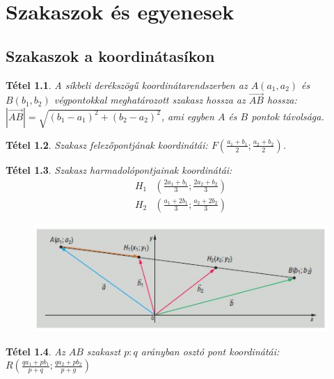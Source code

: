 \documentclass[twoside,12pt]{report}
\newtheorem{theorem}{Tétel}[section]
\theoremstyle{definition}
\begin{document}
\chapter{Szakaszok és egyenesek}
\section{Szakaszok a koordinátasíkon}
	\begin{theorem}
		A síkbeli derékszögű koordinátarendszerben az $A(a_1,a_2)$ és $B(b_1,b_2)$ végpontokkal meghatározott szakasz hossza az $\overrightarrow{AB}$ hossza: $|\overrightarrow{AB}|=\sqrt{(b_1-a_1)^2+(b_2-a_2)^2}$, ami egyben $A$ és $B$ pontok távolsága.
	\end{theorem}
	\begin{theorem}
		Szakasz felezőpontjának koordinátái: $F\left(\frac{a_1+b_1}{2};\frac{a_2+b_2}{2}\right)$.
	\end{theorem}
	\begin{theorem}
		Szakasz harmadolópontjainak koordinátái:
		\begin{align*}
			H_1&\left(\frac{2a_1+b_1}{3};\frac{2a_2+b_2}{3}\right)\\
			H_2&\left(\frac{a_1+2b_1}{3};\frac{a_2+2b_2}{3}\right)
		\end{align*}
		\begin{figure}[H]
			\centering
			\includegraphics[width=0.8\linewidth]{Harmad}
		\end{figure}
	\end{theorem}
	\begin{theorem}
		Az $AB$ szakaszt $p:q$ arányban osztó pont koordinátái: $R\left(\frac{qa_1+pb_1}{p+q};\frac{qa_2+pb_2}{p+g}\right)$
	\end{theorem}
\end{document}
